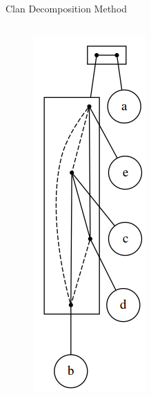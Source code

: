 \documentclass[11pt]{beamer}
\begin{document}
\begin{frame}{Clan Decomposition Method}
\begin{columns}
            \begin{column}{0.4\textwidth}
            \begin{figure}
                \centering
                \includegraphics[width=0.4 \textwidth]{img/exampleasydecomp.png}
                \end{figure}
            \end{column}
        \end{columns}
	\end{frame}
\end{document}
